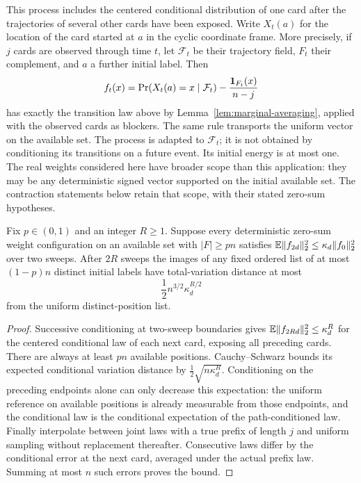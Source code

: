 This process includes the centered conditional distribution of one card
after the trajectories of several other cards have been exposed. Write $X_t(a)$ for the location of the card started at $a$ in the
cyclic coordinate frame. More precisely, if $j$ cards are observed through time $t$, let $\mathcal F_t$
be their trajectory field, $F_t$ their complement, and $a$ a further
initial label. Then
\begin{equation}\label{cycles:conditional-weight}
 f_t(x)=\Pr(X_t(a)=x\mid\mathcal F_t)
               -\frac{\mathbf 1_{F_t}(x)}{n-j}
\end{equation}
has exactly the transition law above by
Lemma~\ref{lem:marginal-averaging}, applied with the observed cards as
blockers. The same rule transports the uniform vector on the available
set. The process is adapted to $\mathcal F_t$; it is not obtained by
conditioning its transitions on a future event. Its initial energy is
at most one. The real weights considered here have broader scope than
this application: they may be any deterministic signed vector supported
on the initial available set. The contraction statements below retain
that scope, with their stated zero-sum hypotheses.

\begin{lemma}
\label{cycles:list}
Fix $p\in(0,1)$ and an integer $R\ge1$. Suppose every deterministic
zero-sum weight configuration on an available set with $|F|\ge pn$ satisfies
$\mathbb E\|f_{2d}\|_2^2\le \kappa_d\|f_0\|_2^2$ over two sweeps.
After $2R$ sweeps the images of any fixed ordered list of at most
$(1-p)n$ distinct initial labels have total-variation distance at most
\begin{equation}\label{cycles:list-error}
 \frac12 n^{3/2}\kappa_d^{R/2}
\end{equation}
from the uniform distinct-position list.
\end{lemma}
\begin{proof}
Successive conditioning at two-sweep boundaries gives
$\mathbb E\|f_{2Rd}\|_2^2\le \kappa_d^R$ for the centered conditional law of each
next card, exposing all preceding cards. There are always at least $pn$
available positions. Cauchy--Schwarz bounds its expected conditional
variation distance by $\frac12\sqrt{n\kappa_d^R}$. Conditioning on the preceding
endpoints alone can only decrease this expectation: the uniform reference
on available positions is already measurable from those endpoints, and the
conditional law is the conditional expectation of the path-conditioned
law. Finally interpolate between joint laws with a true prefix of length
$j$ and uniform sampling without replacement thereafter. Consecutive
laws differ by the conditional error at the next card, averaged under
the actual prefix law. Summing at most $n$ such errors proves the bound.
\end{proof}

